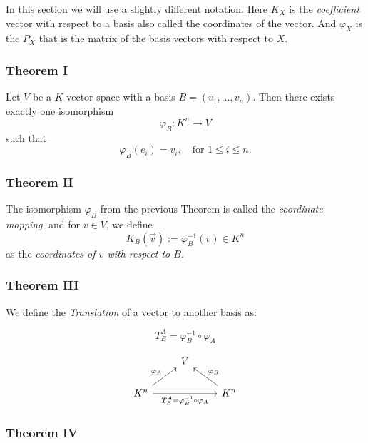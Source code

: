 In this section we will use a slightly different notation. Here \(K_X\) is 
the \emph{coefficient} vector with respect to a basis also called the coordinates
of the vector. And \(\varphi_X\) is the \(P_X\) that is the matrix of the basis vectors with
respect to \(X\).

\subsubsection{Theorem I} 

Let \( V \) be a \( K \)-vector space with a 
basis \( B = (v_1, \ldots, v_n) \).  
Then there exists exactly one isomorphism 
\[
\varphi_B : K^n \to V
\]
such that
\[
\varphi_B(e_i) = v_i, \quad \text{for } 1 \leq i \leq n.
\]

\subsubsection{Theorem II} 

The isomorphism \( \varphi_B \) from the previous 
Theorem is called the \emph{coordinate mapping},  
and for \( v \in V \), we define
\[
K_B (\vec{v}) := \varphi_B^{-1} (v) \in K^n
\]
as the \emph{coordinates of \( v \) with respect to \( B \)}.

\subsubsection{Theorem III} 

We define the \emph{Translation} of a vector to another
basis as:

\[
T_{B}^{A} = \varphi_{B}^{-1} \circ \varphi_A
\]

\[
\begin{tikzcd}
& V & \\
K^n \arrow[ur, "\varphi_A"] \arrow[rr, "T_{B}^{A} = \varphi_B^{-1} \circ \varphi_A"'] & & K^n \arrow[ul, "\varphi_B"']
\end{tikzcd}
\]

\subsubsection{Theorem IV} 

